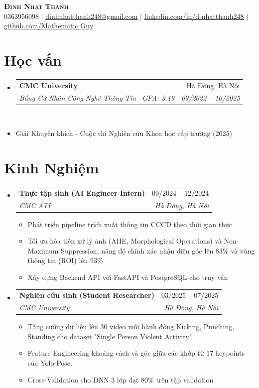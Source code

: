 \documentclass[letterpaper,11pt]{article}
\makeatletter
\newcommand{\resumeItem}[1]{
  \item\small{
    {#1 \vspace{-2pt}}
  }
}
\newcommand{\resumeSubheading}[4]{
  \vspace{-2pt}\item
    \begin{tabular*}{0.97\textwidth}[t]{l@{\extracolsep{\fill}}r}
      \textbf{#1} & #2 \\
      \textit{\small#3} & \textit{\small #4} \\
    \end{tabular*}\vspace{-7pt}
}
\newcommand{\resumeSubHeadingListStart}{\begin{itemize}[leftmargin=0.15in, label={}]}
\newcommand{\resumeSubHeadingListEnd}{\end{itemize}}
\makeatother
\begin{document}
\begin{center}
    \textbf{\Huge \scshape Đinh Nhật Thành} \\ \vspace{1pt}
    \small 0363956098 $|$ \href{mailto:dinhnhatthanh248@gmail.com}{\underline{dinhnhatthanh248@gmail.com}} $|$
    \href{https://linkedin.com/in/d-nhatthanh248}{\underline{linkedin.com/in/d-nhatthanh248}} $|$
    \href{https://github.com/MathematicGuy}{\underline{github.com/Mathematic Guy}}
\end{center}

\section{Học vấn}
	\resumeSubHeadingListStart
	\resumeSubheading
		{CMC University}{Hà Đông, Hà Nội}
		{Bằng Cử Nhân Công Nghệ Thông Tin \textbar \ GPA: 3.19}{09/2022 -- 10/2025} \\
		\resumeItem{} {Giải Khuyến khích - Cuộc thi Nghiên cứu Khoa học cấp trường (2025)}
	\resumeSubHeadingListEnd

\section{Kinh Nghiệm}
	\resumeSubHeadingListStart
	\resumeSubheading
		{Thực tập sinh (AI Engineer Intern)}{09/2024 -- 12/2024}
		{CMC ATI}{Hà Đông, Hà Nội}

		\begin{itemize}
			\item Phát triển pipeline trích xuất thông tin CCCD theo thời gian thực
			\item Tối ưu hóa tiền xử lý ảnh (AHE, Morphological Operations) và Non-Maximum Suppression, nâng độ chính xác nhận diện góc lên 83\% và vùng thông tin (ROI) lên 93\%
			\item Xây dựng Backend API với FastAPI và PostgreSQL cho truy vấn
		\end{itemize}

	\resumeSubheading
		{Nghiên cứu sinh (Student Researcher)}{03/2025 -- 07/2025}
		{CMC University}{Hà Đông, Hà Nội}
		\begin{itemize}
			\item Tăng cường dữ liệu lên 30 video mỗi hành động Kicking, Punching, Standing cho dataset "Single Person Violent Activity"
			\item Feature Engineering khoảng cách và góc giữa các khớp từ 17 keypoints của Yolo-Pose.
			\item Cross-Validation cho DNN 3 lớp đạt 80\% trên tập validation
		\end{itemize}
	\resumeSubHeadingListEnd
\end{document}
